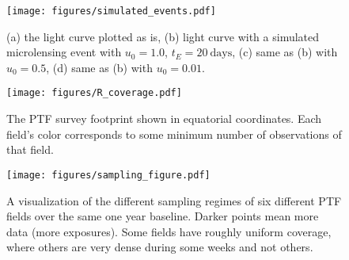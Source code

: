 \documentclass[12pt,preprint]{aastex}
\begin{document}
\clearpage
\setlength{\baselineskip}{0.6\baselineskip}

\setlength{\baselineskip}{1.667\baselineskip}


%
%

\begin{figure}
	\centering
	\caption{(a) the light curve plotted as is, (b) light curve with a simulated microlensing event with $u_0=1.0$, $t_E=20~\mathrm{days}$, (c) same as (b) with $u_0=0.5$, (d) same as (b) with $u_0=0.01$.}
    \texttt{[image: figures/simulated\_events.pdf]}
    \label{fig:microlensing_sim}
\end{figure}

\begin{figure}
	\centering
	\caption{The PTF survey footprint shown in equatorial coordinates. Each field's color corresponds to some minimum number of observations of that field. }
    \texttt{[image: figures/R\_coverage.pdf]}
    \label{fig:survey_footprint}
\end{figure}	

\begin{figure}
	\centering
	\caption{A visualization of the different sampling regimes of six different PTF fields over the same one year baseline. Darker points mean more data (more exposures). Some fields have roughly uniform coverage, where others are very dense during some weeks and not others. }
    \texttt{[image: figures/sampling\_figure.pdf]}
    \label{fig:sampling}
\end{figure}

%
%
\end{document}

